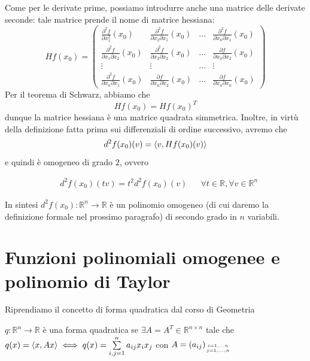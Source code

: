 Come per le derivate prime, possiamo introdurre anche una matrice delle derivate seconde: tale matrice prende il nome di matrice hessiana:
\begin{equation}
Hf(x_0) = \begin{pmatrix}
\frac{\partial^2 f}{\partial x_1^2}(x_0) & \frac{\partial^2 f}{\partial x_2 \partial x_1}(x_0) & \ldots & \frac{\partial^2 f}{\partial x_n \partial x_1}(x_0) \\
\frac{\partial^2 f}{\partial x_1 \partial x_2}(x_0) & \frac{\partial^2 f}{\partial x_2 \partial x_2}(x_0) & \ldots & \frac{\partial f}{\partial x_n \partial x_2}(x_0) \\
\vdots & \vdots & \ldots & \vdots \\
\frac{\partial^2 f}{\partial x_n \partial x_1}(x_0) & \frac{\partial f}{\partial x_n \partial x_2}(x_0) & \ldots & \frac{\partial f}{\partial x_n \partial x_n}(x_0)
\end{pmatrix}
\end{equation}
Per il teorema di Schwarz, abbiamo che 
$$
Hf(x_0) = Hf(x_0)^T
$$
dunque la matrice hessiana è una matrice quadrata simmetrica. Inoltre, in virtù della definizione fatta prima sui differenziali di ordine successivo, avremo che
$$
d^2 f(x_0)(v) = \langle v, Hf(x_0)(v) \rangle
$$
e quindi è omogeneo di grado $2$, ovvero

\[\begin{aligned}
&d^2 f(x_0)(tv) = t^2 d^2 f(x_0)(v) & &\forall t \in \mathbb{R}, \forall v \in \mathbb{R}^n
\end{aligned}\]

In sintesi $d^2 f (x_0): \mathbb{R}^n \to \mathbb{R}$ è un polinomio omogeneo (di cui daremo la definizione formale nel prossimo paragrafo) di secondo grado in $n$ variabili. \\

%
%
%
\vspace{0.5cm}
\section{Funzioni polinomiali omogenee e polinomio di Taylor}
\label{sec:polinomio_taylor}
Riprendiamo il concetto di forma quadratica dal corso di Geometria

\vspace{0.5cm}
\begin{definition}[\textcolor{blue}{forma quadratica}]
$q: \mathbb{R}^n \to \mathbb{R}$ è una forma quadratica se $\exists A = A^T \in \mathbb{R}^{n \times n}$ tale che $q(x)=\langle x, Ax \rangle \iff q(x) = \sum\limits_{i,j=1}^n a_{ij}x_i x_j$ con $A = (a_{ij})_{i=1, \ldots n \atop j=1, \ldots, n}$
\end{definition}

